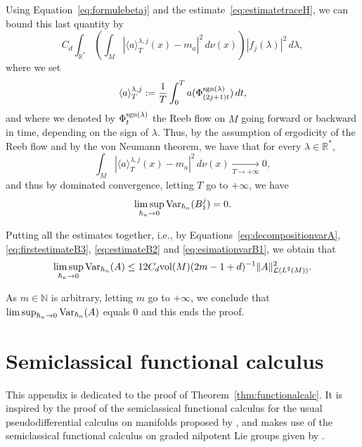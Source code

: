 \documentclass[12pt,a4paper]{amsart}
\theoremstyle{plain}
\theoremstyle{definition}
\theoremstyle{remark}
\numberwithin{equation}{section}
\theoremstyle{definition}
\def\R{{\mathbb R}}%
\def\N{{\mathbb N}}%
\def\Tend#1#2{\mathop{\longrightarrow}\limits_{#1\rightarrow#2}}
\numberwithin{equation}{section}
\begin{document}
Using Equation~\eqref{eq:formulebetaj} and the estimate~\eqref{eq:estimatetraceH}, we can bound this last quantity by
\begin{equation*}
    C_d\int_{\R^*}\left(\int_M |\langle a\rangle_T^{\lambda,j}(x)-m_a|^2\,d\nu(x)\right)|f_j(\lambda)|^2\,d\lambda,
\end{equation*}
where we set
\begin{equation*}
    \langle a\rangle_T^{\lambda,j} := \frac{1}{T}\int_0^T a(\Phi_{(2j+1)t}^{{\rm sgn}(\lambda)})\,dt,
\end{equation*}
and where we denoted by $\Phi_t^{{\rm sgn}(\lambda)}$ the Reeb flow on $M$ going forward or backward in time, depending on the sign of $\lambda$.
Thus, by the assumption of ergodicity of the Reeb flow and by the von Neumann theorem, we have that for every $\lambda\in \R^*$, 
\begin{equation*}
    \int_M |\langle a\rangle_T^{\lambda,j}(x)-m_a|^2\,d\nu(x)\Tend{T}{+\infty} 0,
\end{equation*}
and thus by dominated convergence, letting $T$ go to $+\infty$, we have
\begin{equation}
    \label{eq:esimationvarB1}
    \limsup_{\hbar_n\rightarrow 0}{\rm Var}_{\hbar_n}(B_1^j) = 0.
\end{equation}

\vspace{0.25cm}

Putting all the estimates together, i.e., by Equations~\eqref{eq:decompositionvarA}, \eqref{eq:firstestimateB3}, \eqref{eq:estimateB2} and \eqref{eq:esimationvarB1}, we obtain that
\begin{equation*}
    \limsup_{\hbar_n\rightarrow 0}{\rm Var}_{\hbar_n}(A) \leq 12 C_d {\rm vol}(M)(2m-1+d)^{-1} \|A\|_{\mathcal{L}(L^2(M))}^2.
\end{equation*}

As $m\in \N$ is arbitrary, letting $m$ go to $+\infty$, we conclude that $\limsup_{\hbar_n\rightarrow 0}{\rm Var}_{\hbar_n}(A)$ equals 0 and this ends the proof. 

\appendix

\section{Semiclassical functional calculus}
\label{sect:functionalcalc}

This appendix is dedicated to the proof of Theorem~\ref{thm:functionalcalc}. It is inspired by the proof of the semiclassical functional calculus for the usual pseudodifferential calculus on manifolds proposed by \cite{BK}, and makes use of the semiclassical functional calculus on graded nilpotent Lie groups given by \cite{FM}.
\end{document}
